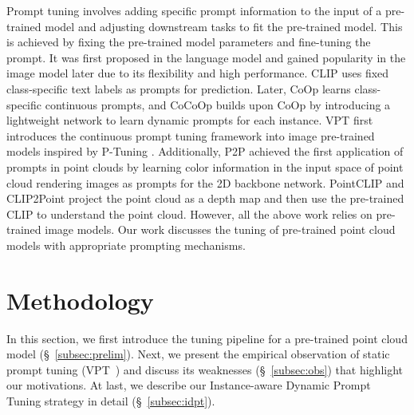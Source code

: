\documentclass[10pt,twocolumn,letterpaper]{article}
\begin{document}
Prompt tuning involves adding specific prompt information to the input of a pre-trained model and adjusting downstream tasks to fit the pre-trained model. This is achieved by fixing the pre-trained model parameters and fine-tuning the prompt. It was first proposed in the language model \cite{brown2020language,gao2020making,lester2021power,liu2023pre,liu2021p,liu2021gpt} and gained popularity in the image model \cite{radford2021learning,rao2022denseclip,tsimpoukelli2021multimodal,zhou2022learning,zhou2022conditional} later due to its flexibility and high performance. CLIP \cite{radford2021learning} uses fixed class-specific text labels as prompts for prediction. Later, CoOp \cite{zhou2022learning} learns class-specific continuous prompts, and CoCoOp \cite{zhou2022conditional} builds upon CoOp by introducing a lightweight network to learn dynamic prompts for each instance. VPT \cite{jia2022visual} first introduces the continuous prompt tuning framework into image pre-trained models inspired by P-Tuning \cite{liu2021p}. Additionally, P2P \cite{wang2022p2p} achieved the first application of prompts in point clouds by learning color information in the input space of point cloud rendering images as prompts for the 2D backbone network. PointCLIP \cite{zhang2022pointclip} and CLIP2Point \cite{huang2022clip2point} project the point cloud as a depth map and then use the pre-trained CLIP \cite{radford2021learning} to understand the point cloud.  However, all the above work relies on pre-trained image models. Our work discusses the tuning of pre-trained point cloud models with appropriate prompting mechanisms.


\section{Methodology}
In this section, we first introduce the tuning pipeline for a pre-trained point cloud model (\S~\ref{subsec:prelim}). Next, we present the empirical observation of static prompt tuning (\eg VPT~\cite{jia2022visual}) and discuss its weaknesses (\S~\ref{subsec:obs}) that highlight our motivations. 
At last, we describe our Instance-aware Dynamic Prompt Tuning strategy in detail (\S~\ref{subsec:idpt}). 
\end{document}
